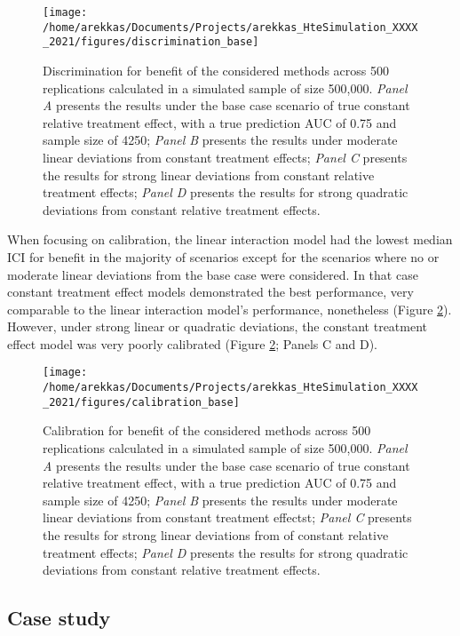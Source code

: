 \documentclass{article}
\begin{document}
\begin{figure}
\texttt{[image: /home/arekkas/Documents/Projects/arekkas\_HteSimulation\_XXXX\_2021/figures/discrimination\_base]} \caption{Discrimination for benefit of the considered methods across 500 replications calculated in a simulated sample of size 500,000. \textit{Panel A} presents the results under the base case scenario of true constant relative treatment effect, with a true prediction AUC of 0.75 and sample size of 4250; \textit{Panel B} presents the results under moderate linear deviations from constant treatment effects; \textit{Panel C} presents the results for strong linear deviations from constant relative treatment effects; \textit{Panel D} presents the results for strong quadratic deviations from constant relative treatment effects.}\label{fig:discrimination}
\end{figure}

When focusing on calibration, the linear interaction model had the
lowest median ICI for benefit in the majority of scenarios except for
the scenarios where no or moderate linear deviations from the base case
were considered. In that case constant treatment effect models
demonstrated the best performance, very comparable to the linear
interaction model's performance, nonetheless (Figure
\ref{fig:calibration}). However, under strong linear or quadratic
deviations, the constant treatment effect model was very poorly
calibrated (Figure \ref{fig:calibration}; Panels C and D).

\begin{figure}
\texttt{[image: /home/arekkas/Documents/Projects/arekkas\_HteSimulation\_XXXX\_2021/figures/calibration\_base]} \caption{Calibration for benefit of the considered methods across 500 replications calculated in a simulated sample of size 500,000. \textit{Panel A} presents the results under the base case scenario of true constant relative treatment effect, with a true prediction AUC of 0.75 and sample size of 4250; \textit{Panel B} presents the results under moderate linear deviations from constant treatment effectst; \textit{Panel C} presents the results for strong linear deviations from of constant relative treatment effects; \textit{Panel D} presents the results for strong quadratic deviations from constant relative treatment effects.}\label{fig:calibration}
\end{figure}

\hypertarget{case-study}{%
\subsection{Case study}\label{case-study}}
\end{document}
